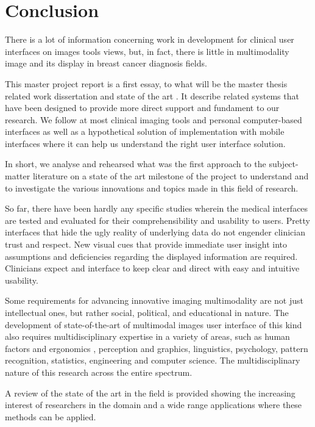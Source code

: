 
\chapter{Conclusion}
\label{chapter:conclusion}

There is a lot of information concerning work in development for clinical user interfaces on images tools views, but, in fact, there is little in multimodality image and its display in breast cancer diagnosis fields.

This master project report is a first essay, to what will be the master thesis related work dissertation and state of the art \cite{borchers2012persuasion}. It describe related systems that have been designed to provide more direct support and fundament to our research. We follow at most clinical imaging tools and personal computer-based interfaces as well as a hypothetical solution of implementation with mobile interfaces where it can help us understand the right user interface solution.

In short, we analyse and rehearsed what was the first approach to the subject-matter literature on a state of the art milestone of the project to understand and to investigate the various innovations and topics made in this field of research.

So far, there have been hardly any specific studies wherein the medical interfaces are tested and evaluated for their comprehensibility and usability to users. Pretty interfaces that hide the ugly reality of underlying data do not engender clinician trust and respect. New visual cues that provide immediate user insight into assumptions and deficiencies regarding the displayed information are required. Clinicians expect and interface to keep clear and direct with easy and intuitive usability.

Some requirements for advancing innovative imaging multimodality are not just intellectual ones, but rather social, political, and educational in nature. The development of state-of-the-art of multimodal images user interface of this kind also requires multidisciplinary expertise in a variety of areas, such as human factors and ergonomics \cite{borchers2012persuasion}, perception and graphics, linguistics, psychology, pattern recognition, statistics, engineering and computer science. The multidisciplinary nature of this research across the entire spectrum.

A review of the state of the art in the field is provided showing the increasing interest of researchers in the domain and a wide range applications where these methods can be applied.

